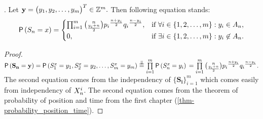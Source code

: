 \begin{thm}
  \Lrwm. Let $\mathbf{y}=\begin{pmatrix}
   y_1, y_2, \ldots, y_m
  \end{pmatrix}^T\in \mathbb{Z}^m.$ Then following equation stands:
  \[
  \operatorname{\textsf{P}} \left( S_n=x \right) =
  \begin{cases}
  \prod_{i=1}^{m}\binom{n}{\frac{y_i+n}{2}}{p_i}^{\frac{n+y_i}{2}}{q_i}^{\frac{n-y_i}{2}}, & \text{if $\forall i \in \{1, 2, \ldots, m\}:y_i\in A_n$},\\
  0, & \text{if $\exists i \in \{1, 2, \ldots, m\}:y_i\not\in A_n$}.
  \end{cases}
  \]

\end{thm}
\begin{proof}
  $\pr\left(\mathbf{S_n}=\mathbf{y}\right)
    =\pr\left( \s[1]=y_1, \s[2]=y_2, \ldots, \s[m]=y_m\right)
    \overset{\indep}{=}\prod\limits_{i=1}^{m}\pr\left(\s =y_i\right)\\
    =\prod\limits_{i=1}^{m}\binom{n}{\frac{y_i+n}{2}}{p_i}^{\frac{n+y_i}{2}}{q_i}^{\frac{n-y_i}{2}}.$ The second equation comes from the independency of $\{\mathbf{S_i}\}_{i=1}^m$ which comes easily from independency of $\indexx[i][n][X]$. The second equation comes from the theorem of probability of position and time from the first chapter (\ref {thm-probability_position_time}).
\end{proof}
